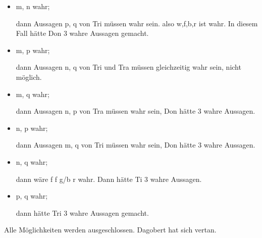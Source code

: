 \documentclass{article}
\begin{document}
\begin{itemize}
\item m, n wahr;

  dann Aussagen p, q von Tri müssen wahr sein. also w,f,b,r ist wahr.
  In diesem Fall hätte Don 3 wahre Aussagen gemacht.

\item m, p wahr;

  dann Aussagen n, q von Tri und Tra müssen gleichzeitig wahr sein,
  nicht möglich.

\item m, q wahr;

  dann Aussagen n, p von Tra müssen wahr sein, Don hätte 3 wahre Aussagen.
\item n, p wahr;

  dann Aussagen m, q von Tri müssen wahr sein, Don hätte 3 wahre Aussagen.
\item n, q wahr;

  dann wäre f f g/b r wahr.  Dann hätte Ti  3 wahre Aussagen.
\item p, q wahr;

  dann hätte Tri 3 wahre Aussagen gemacht.
\end{itemize}

Alle Möglichkeiten werden ausgeschlossen.  Dagobert hat sich vertan.
\end{document}

